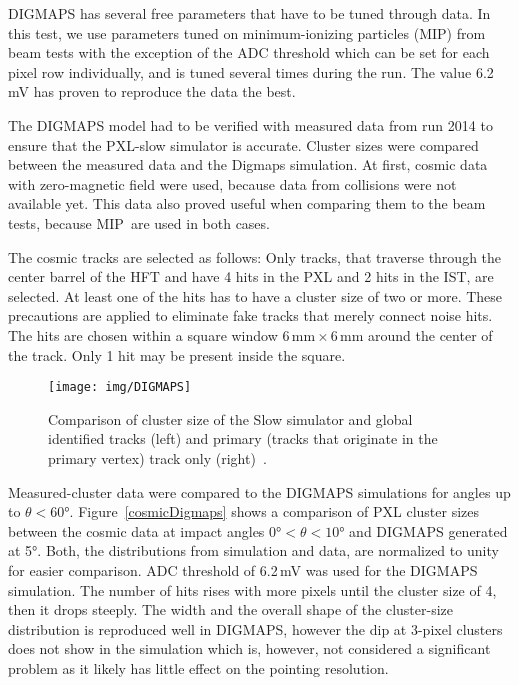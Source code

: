 DIGMAPS has several free parameters that have to be tuned through data. In this test, we use parameters tuned on minimum-ionizing particles (MIP) from beam tests with the exception of the ADC threshold which can be set for each pixel row individually, and is tuned several times during the run. The value 6.2$\,$mV has proven to reproduce the data the best.
 
The DIGMAPS model had to be verified with measured data from run 2014 to ensure that the PXL-slow simulator is accurate. Cluster sizes were compared between the measured data and the Digmaps simulation. At first, cosmic data with zero-magnetic field were used, because data from collisions were not available yet. This data also proved useful when comparing them to the beam tests, because MIP\ are used in both cases.


The cosmic tracks are selected as follows: Only tracks, that traverse through the center barrel of the HFT and have 4 hits in the PXL and 2 hits in the IST, are selected. At least one of the hits has to have a cluster size of two or more. These precautions are applied to eliminate fake tracks that merely connect noise hits. The hits are chosen within a square window $6\,\mathrm{mm}\times6\,\mathrm{mm}$ around the center of the track. Only 1 hit may be present inside the square.

\begin{figure}[!tb]
\begin{center}
 \texttt{[image: img/DIGMAPS]}\\
\end{center}
\caption[Comparison of cluster size of the Slow simulator and global identified tracks and primary track only.]{\label{AuAuDigmaps}Comparison of cluster size of the Slow simulator and global identified tracks (left) and primary (tracks that originate in the primary vertex) track only
(right)~\cite{KubaVyzkumak}.}
\end{figure}


Measured-cluster data were compared to the DIGMAPS simulations for angles up to $\theta < 60$°. Figure~\ref{cosmicDigmaps} shows a comparison of PXL cluster sizes between the cosmic data at impact angles $0\text{°} < \theta < 10$° and DIGMAPS generated at 5°\@. Both, the distributions from simulation and data, are normalized to unity for easier comparison.  ADC threshold of 6.2$\,$mV was used for the DIGMAPS simulation. The number of hits rises with more pixels until the cluster size of 4, then it drops steeply. The width and the overall shape of the cluster-size distribution is reproduced well in DIGMAPS, however the dip at 3-pixel clusters does not show in the simulation which is, however, not considered a significant problem as it likely has little effect on the pointing resolution.



